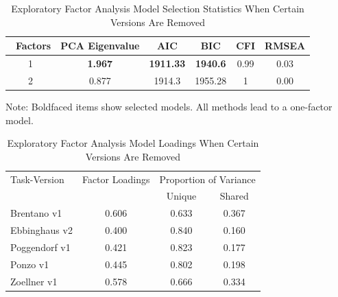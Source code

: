 \documentclass[man, 12pt]{apa7} %
\begin{document}
\begin{table}[htbp]
    \centering
    \caption{Exploratory Factor Analysis Model Selection Statistics When Certain Versions Are Removed}
    \label{tab:EFA-5}
    \begin{threeparttable}
        \begin{tabular}{cccccc}
            \hline
            \ {Factors} & {PCA Eigenvalue} & {AIC} & {BIC} & {CFI} & {RMSEA} \\
            \hline
            1 & \textbf{1.967} & \textbf{1911.33} & \textbf{1940.6} & 0.99 & 0.03\\
            2 & 0.877 & 1914.3 & 1955.28 & 1
            & 0.00\\
            \hline
        \end{tabular}
        \vspace{5pt}
        \begin{tablenotes}
            \small
            \item Note: Boldfaced items show selected models.  All methods lead to a one-factor model.
        \end{tablenotes}
    \end{threeparttable}
\end{table}


\begin{table}[htbp]
    \centering
    \caption{Exploratory Factor Analysis Model Loadings When Certain Versions Are Removed}
    \label{tab:Fac-5}
    \begin{threeparttable}
        \begin{tabular}{l|c|cc}
            \toprule
            Task-Version
            & \multicolumn{1}{c|}{Factor Loadings} & \multicolumn{2}{c}{Proportion of Variance} \\
             &  & Unique & Shared \\
            \midrule
            Brentano v1 & 0.606 & 
            0.633 & 0.367 \\
            Ebbinghaus v2 & 0.400 & 
            0.840 & 0.160 \\
            Poggendorf v1 & 0.421 & 
            0.823 & 0.177 \\
            Ponzo v1 & 0.445 & 
            0.802 & 0.198 \\
            Zoellner v1 & 0.578 & 
            0.666 & 0.334 \\
            \bottomrule
        \end{tabular}
        \vspace{5pt}
    \end{threeparttable}
\end{table}
\end{document}
